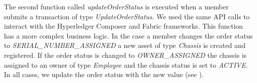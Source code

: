 The second function called \emph{updateOrderStatus} is executed when a member submits a transaction of type \emph{UpdateOrderStatus}. We used the same API calls to interact with the Hyperledger Composer and Fabric frameworks. This function has a more complex business logic. In the case a member changes the order status to \emph{SERIAL_NUMBER_ASSIGNED} a new asset of type \emph{Chassis} is created and registered. If the order status is changed to \emph{OWNER_ASSIGNED} the chassis is assigned to an owner of type \emph{Employee} and the chassis status is set to \emph{ACTIVE}. In all cases, we update the order status with the new value (see ).












